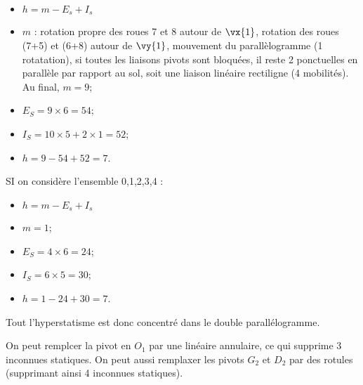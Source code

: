 \ifprof
\ifcolle
\else
\begin{itemize}
\item $h = m -E_s + I_s$ 
\item $m$ : rotation propre des roues 7 et 8 autour de $\vx{1}$, rotation des roues (7+5) et (6+8) autour de $\vy{1}$,  mouvement du parallèlogramme (1 rotatation), si toutes les liaisons pivots sont bloquées, il reste 2 ponctuelles en parallèle par rapport au sol, soit une liaison linéaire rectiligne (4 mobilités). Au final, $m=9$;
\item $E_S =9\times 6 = 54$;
\item $I_S = 10\times 5 + 2 \times 1 = 52$;
\item $h = 9 -54 + 52 = 7$.
\end{itemize}
\fi
\else
\fi
{}
\ifprof
SI on considère l'ensemble 0,1,2,3,4 : 
\begin{itemize}
\item $h = m -E_s + I_s$ 
\item $m = 1$; 
\item $E_S =4\times 6 = 24$;
\item $I_S = 6\times 5  = 30$;
\item $h = 1 -24 + 30 = 7$. 
\end{itemize}
Tout l'hyperstatisme est donc concentré dans le double parallélogramme. 

On peut remplcer la pivot en $O_1$ par une linéaire annulaire, ce qui supprime 3 inconnues statiques. 
On peut aussi remplaxer les pivots $G_2$ et $D_2$ par des rotules (supprimant ainsi 4 inconnues statiques).
\else
\fi
 

\ifprof
\else
\ifcolle\else
{}

\fi
\fi